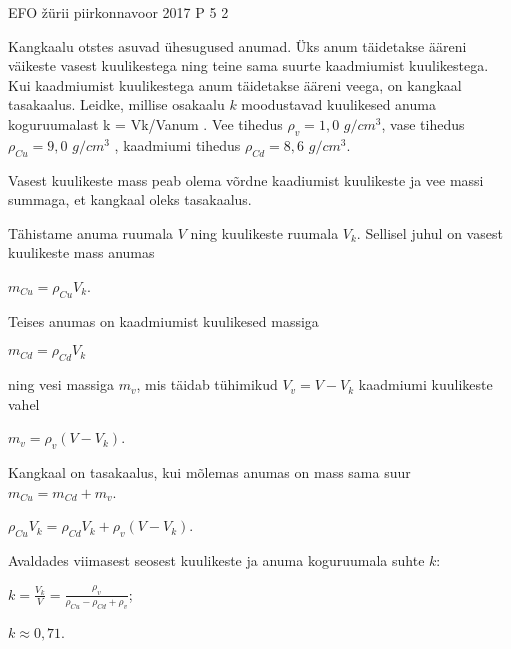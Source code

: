 {EFO žürii} %
{piirkonnavoor} %
{2017} %
{P 5} %
{2} %
{

\ifStatement
Kangkaalu otstes asuvad ühesugused anumad. Üks anum täidetakse ääreni väikeste vasest kuulikestega ning teine sama suurte kaadmiumist kuulikestega. Kui kaadmiumist kuulikestega anum täidetakse ääreni veega, on kangkaal tasakaalus. Leidke, millise osakaalu $k$ moodustavad kuulikesed anuma koguruumalast k = Vk/Vanum . Vee tihedus $\rho_v = 1,0$ $g/cm^3$, vase tihedus $\rho_{Cu} = 9,0$ $g/cm^3$ , kaadmiumi tihedus $\rho_{Cd} = 8,6$ $g/cm^3$.
\fi

\ifHint
Vasest kuulikeste mass peab olema võrdne kaadiumist kuulikeste ja vee massi summaga, et kangkaal oleks tasakaalus.
\fi

\ifSolution
Tähistame anuma ruumala $V$ ning kuulikeste ruumala $V_k$. Sellisel juhul on vasest kuulikeste mass anumas
\begin{center}
$m_{Cu} = \rho_{Cu}V_k$. 
\end{center}
Teises anumas on kaadmiumist kuulikesed massiga 
\begin{center}
$m_{Cd} = \rho_{Cd} V_k$ 
\end{center}
ning vesi massiga $m_v$, mis täidab tühimikud $V_v = V - V_k$ kaadmiumi kuulikeste vahel 
\begin{center}
$m_v = \rho_v(V - V_k)$.
\end{center}
Kangkaal on tasakaalus, kui mõlemas anumas on mass sama suur $m_{Cu} = m_{Cd} + m_v$.
\begin{center}
$\rho_{Cu}V_k = \rho_{Cd}V_k + \rho_v(V - V_k)$.
\end{center}
Avaldades viimasest seosest kuulikeste ja anuma koguruumala suhte $k$:
\begin{center}
$k = \frac{V_k}{V} = \frac{\rho_v}{\rho_{Cu} - \rho_{Cd} + \rho_v}$;
\end{center}
\begin{center}
$k \approx 0,71$. 
\end{center}
\fi
}